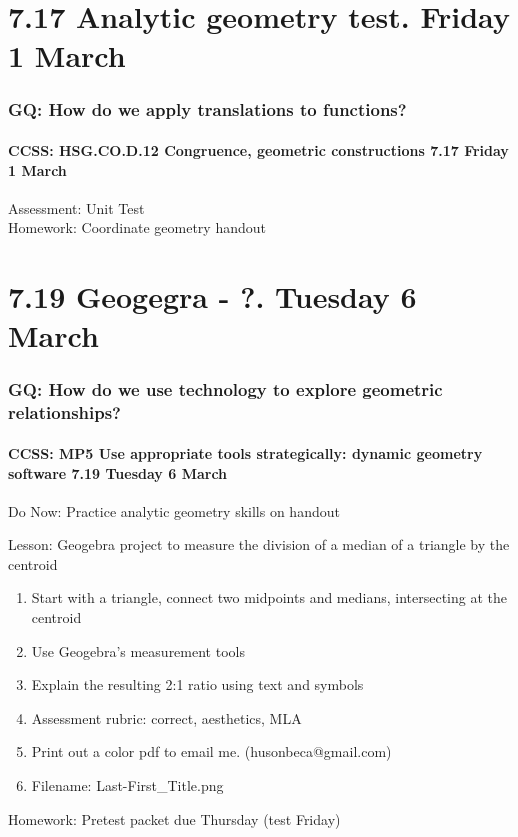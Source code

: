 \documentclass{beamer}
\begin{document}
\section{7.17 Analytic geometry test. Friday 1 March}
  \frame
  {
    \frametitle{GQ: How do we apply translations to functions?}
    \framesubtitle{CCSS: HSG.CO.D.12 Congruence, geometric constructions \hfill \alert{7.17 Friday 1 March}}

    Assessment: Unit Test\\[0.5cm]
    Homework: Coordinate geometry handout
  }


\section{7.19 Geogegra - ?. Tuesday 6 March}
  \frame
  {
    \frametitle{GQ: How do we use technology to explore geometric relationships?}
    \framesubtitle{CCSS: MP5 Use appropriate tools strategically: dynamic geometry software \hfill \alert{7.19 Tuesday 6 March}}

    Do Now: Practice analytic geometry skills on handout
    \begin{block}{Lesson: Geogebra project to measure the division of a median of a triangle by the centroid}
      \begin{enumerate}
        \item Start with a triangle, connect two midpoints and medians, intersecting at the centroid
        \item Use Geogebra's measurement tools
        \item Explain the resulting 2:1 ratio using text and symbols
        \item Assessment rubric: correct, aesthetics, MLA
        \item Print out a color pdf to email me. (husonbeca@gmail.com)
        \item Filename: Last-First_Title.png
      \end{enumerate}
    \end{block}
    Homework: Pretest packet due Thursday \alert{(test Friday)}
  }
\end{document}

